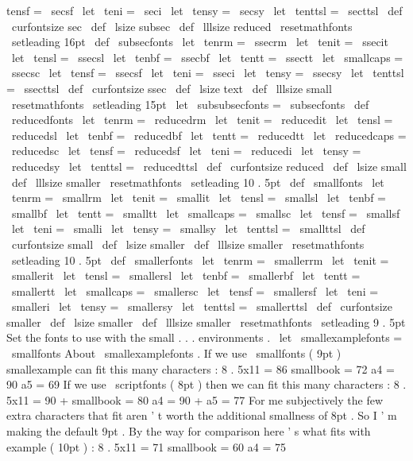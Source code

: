 {{tensf
=
\
secsf
\
let
\
teni
=
\
seci
\
let
\
tensy
=
\
secsy
\
let
\
tenttsl
=
\
secttsl
\
def
\
curfontsize
{
sec
}
%
\
def
\
lsize
{
subsec
}
\
def
\
lllsize
{
reduced
}
%
\
resetmathfonts
\
setleading
{
16pt
}
}
\
def
\
subsecfonts
{
%
\
let
\
tenrm
=
\
ssecrm
\
let
\
tenit
=
\
ssecit
\
let
\
tensl
=
\
ssecsl
\
let
\
tenbf
=
\
ssecbf
\
let
\
tentt
=
\
ssectt
\
let
\
smallcaps
=
\
ssecsc
\
let
\
tensf
=
\
ssecsf
\
let
\
teni
=
\
sseci
\
let
\
tensy
=
\
ssecsy
\
let
\
tenttsl
=
\
ssecttsl
\
def
\
curfontsize
{
ssec
}
%
\
def
\
lsize
{
text
}
\
def
\
lllsize
{
small
}
%
\
resetmathfonts
\
setleading
{
15pt
}
}
\
let
\
subsubsecfonts
=
\
subsecfonts
\
def
\
reducedfonts
{
%
\
let
\
tenrm
=
\
reducedrm
\
let
\
tenit
=
\
reducedit
\
let
\
tensl
=
\
reducedsl
\
let
\
tenbf
=
\
reducedbf
\
let
\
tentt
=
\
reducedtt
\
let
\
reducedcaps
=
\
reducedsc
\
let
\
tensf
=
\
reducedsf
\
let
\
teni
=
\
reducedi
\
let
\
tensy
=
\
reducedsy
\
let
\
tenttsl
=
\
reducedttsl
\
def
\
curfontsize
{
reduced
}
%
\
def
\
lsize
{
small
}
\
def
\
lllsize
{
smaller
}
%
\
resetmathfonts
\
setleading
{
10
.
5pt
}
}
\
def
\
smallfonts
{
%
\
let
\
tenrm
=
\
smallrm
\
let
\
tenit
=
\
smallit
\
let
\
tensl
=
\
smallsl
\
let
\
tenbf
=
\
smallbf
\
let
\
tentt
=
\
smalltt
\
let
\
smallcaps
=
\
smallsc
\
let
\
tensf
=
\
smallsf
\
let
\
teni
=
\
smalli
\
let
\
tensy
=
\
smallsy
\
let
\
tenttsl
=
\
smallttsl
\
def
\
curfontsize
{
small
}
%
\
def
\
lsize
{
smaller
}
\
def
\
lllsize
{
smaller
}
%
\
resetmathfonts
\
setleading
{
10
.
5pt
}
}
\
def
\
smallerfonts
{
%
\
let
\
tenrm
=
\
smallerrm
\
let
\
tenit
=
\
smallerit
\
let
\
tensl
=
\
smallersl
\
let
\
tenbf
=
\
smallerbf
\
let
\
tentt
=
\
smallertt
\
let
\
smallcaps
=
\
smallersc
\
let
\
tensf
=
\
smallersf
\
let
\
teni
=
\
smalleri
\
let
\
tensy
=
\
smallersy
\
let
\
tenttsl
=
\
smallerttsl
\
def
\
curfontsize
{
smaller
}
%
\
def
\
lsize
{
smaller
}
\
def
\
lllsize
{
smaller
}
%
\
resetmathfonts
\
setleading
{
9
.
5pt
}
}
%
Set
the
fonts
to
use
with
the
small
.
.
.
environments
.
\
let
\
smallexamplefonts
=
\
smallfonts
%
About
\
smallexamplefonts
.
If
we
use
\
smallfonts
(
9pt
)
smallexample
%
can
fit
this
many
characters
:
%
8
.
5x11
=
86
smallbook
=
72
a4
=
90
a5
=
69
%
If
we
use
\
scriptfonts
(
8pt
)
then
we
can
fit
this
many
characters
:
%
8
.
5x11
=
90
+
smallbook
=
80
a4
=
90
+
a5
=
77
%
For
me
subjectively
the
few
extra
characters
that
fit
aren
'
t
worth
%
the
additional
smallness
of
8pt
.
So
I
'
m
making
the
default
9pt
.
%
%
By
the
way
for
comparison
here
'
s
what
fits
with
example
(
10pt
)
:
%
8
.
5x11
=
71
smallbook
=
60
a4
=
75
}
